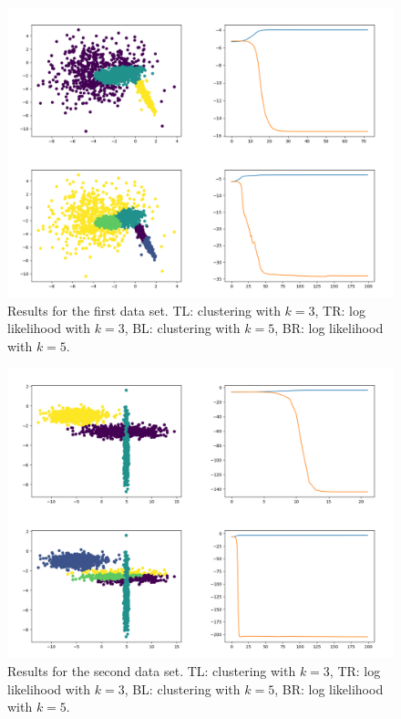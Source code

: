 \documentclass{article}
\begin{document}
\begin{figure}[!ht]
	\centering
	\includegraphics[width=120mm]{figs/gmm_ds0_orthog_plt_ll.png}
	\caption{Results for the first data set. TL: clustering with $k = 3$, TR: log likelihood with $k = 3$, BL: clustering with $k = 5$, BR: log likelihood with $k = 5$.}
\end{figure}

\begin{figure}[!ht]
	\centering
	\includegraphics[width=120mm]{figs/gmm_ds1_orthog_plt_ll.png}
	\caption{Results for the second data set. TL: clustering with $k = 3$, TR: log likelihood with $k = 3$, BL: clustering with $k = 5$, BR: log likelihood with $k = 5$.}
\end{figure}
\end{document}
